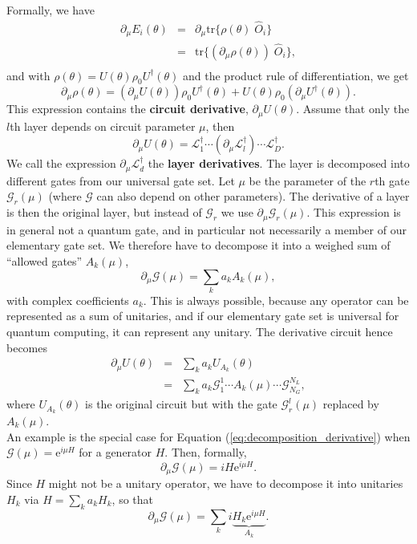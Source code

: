 \documentclass[amsmath,amssymb,aps,pra,10pt,twocolumn,groupedaddress,nofootinbib]{revtex4-1}
\newcommand{\e}{\mathrm{e}}
\newcommand{\tr}{\mathrm{tr}}
\newcommand{\G}{\mathcal{G}}
\begin{document}
Formally, we have
\begin{eqnarray*}
	\partial_{\mu} E_i(\theta) &=& \partial_{\mu} \tr \{\rho(\theta) \; \hat{O}_i\} \\
	&=& \tr \{ (\partial_{\mu}  \rho(\theta)) \; \hat{O}_i\}, \\
\end{eqnarray*}
and with $\rho(\theta) = U(\theta)\rho_0U^{\dagger}(\theta)$ and the product rule of differentiation, we get
\[\partial_{\mu}  \rho(\theta) = \left(\partial_{\mu}   U(\theta)\right) \rho_0U^{\dagger}(\theta) +   U(\theta) \rho_0 \left(\partial_{\mu} U^{\dagger}(\theta)\right)   . \]
This expression contains the \textbf{circuit derivative}, $\partial_{\mu}  U(\theta)$. Assume that only the $l$th layer depends on circuit parameter $\mu$, then
\[
\partial_{\mu}  U(\theta) =  \mathcal{L}_1^{\dagger} \cdots (\partial_{\mu} \mathcal{L}_l^{\dagger})\cdots \mathcal{L}_D^{\dagger}. 
\]
We call the expression $\partial_{\mu} \mathcal{L}_d^{\dagger}$  the \textbf{layer derivatives}. The layer is decomposed into different gates from our universal gate set. Let $\mu$ be the parameter of the $r$th gate $\G_r(\mu)$ (where $\G$ can also depend on other parameters). The derivative of a layer is then the original layer, but instead of $\G_r$ we use $\partial_{\mu} \G_r(\mu)$. This expression is in general not a quantum gate, and in particular not necessarily a member of our elementary gate set. We therefore have to decompose it into a weighed sum of ``allowed gates'' $A_k(\mu)$, 
\begin{equation} 
	\partial_{\mu} \G(\mu) = \sum_k a_k A_k(\mu),
    \label{eq:decomposition_derivative}
\end{equation}
with complex coefficients $a_k$. This is always possible, because any operator can be represented as a sum of unitaries, and if our elementary gate set is universal for quantum computing, it can represent any unitary. The derivative circuit hence becomes
\begin{eqnarray}
\partial_{\mu}  U(\theta)  &=& \sum_k a_k U_{A_k}(\theta) \\
&=& \sum_k a_k \G_1^1 \cdots A_k(\mu) \cdots \G_{N_G}^{N_L},
\end{eqnarray} 
where $U_{A_k}(\theta)$ is the original circuit but with the gate $\G_r^l(\mu)$ replaced by $A_k(\mu)$. \\



An example is the special case for Equation (\ref{eq:decomposition_derivative}) when $\G(\mu) = \e^{i\mu H}$ for a generator $H$. Then, formally,
\[
\partial_{\mu}\G(\mu) = i H \e^{i\mu H}. 
\]
Since $H$ might not be a unitary operator, we have to decompose it into unitaries $H_k$ via $H = \sum_k a_k H_k$, so that 
\[
\partial_{\mu}\G(\mu) = \sum_k i \underbrace{H_k \e^{i\mu H}}_{A_k}. 
\]
\end{document}
